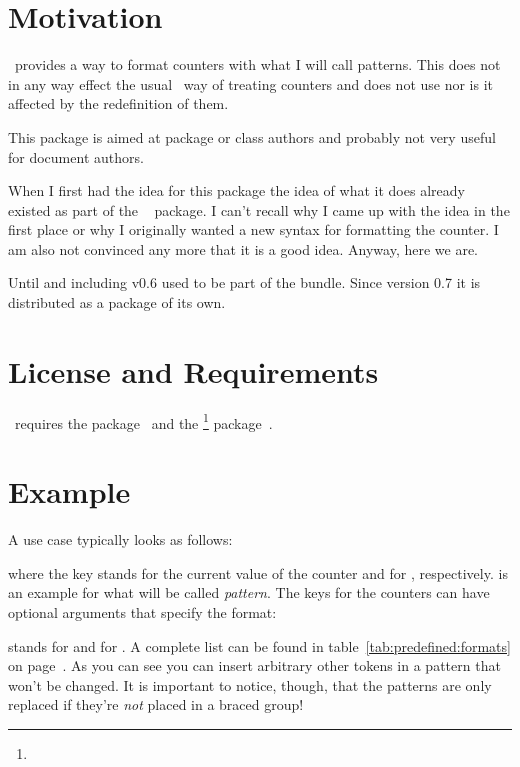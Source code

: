 \documentclass[load-preamble+]{cnltx-doc}
\begin{document}
\section{Motivation}
\cntformats\ provides a way to format counters with what I will call patterns.
This does not in any way effect the usual \LaTeXe\ way of treating counters
and does not use  nor is it affected by the
redefinition of them.

This package is aimed at package or class authors and probably not very useful
for document authors.

When I first had the idea for this package the idea of what it does already
existed as part of the ~\cite{bnd:exsheets} package.  I can't
recall why I came up with the idea in the first place or why I originally
wanted a new syntax for formatting the  counter.  I am also not
convinced any more that it is a good idea.  Anyway, here we are.

Until and including v0.6 \cntformats{} used to be part of
the  bundle.  Since version 0.7 it is distributed as a package
of its own.

\section{License and Requirements}\label{sec:license}
\license

\cntformats\ requires the  package~\cite{pkg:etoolbox}
and the \footnote{} package~\cite{bnd:cnltx}.

\section{Example}
A use case typically looks as follows:
\begin{example}
\end{example}
where the key  stands for the current value of the 
counter and  for , respectively.  is
an example for what will be called \emph{pattern}. The keys for the counters
can have optional arguments that specify the format:
\begin{example}
\end{example}
 stands for  and  for .  A complete list
can be found in table~\ref{tab:predefined:formats} on
page~\pageref{tab:predefined:formats}.  As you can see you can insert
arbitrary other tokens in a pattern that won't be changed. It is important to
notice, though, that the patterns are only replaced if they're \emph{not}
placed in a braced group!
\end{document}
